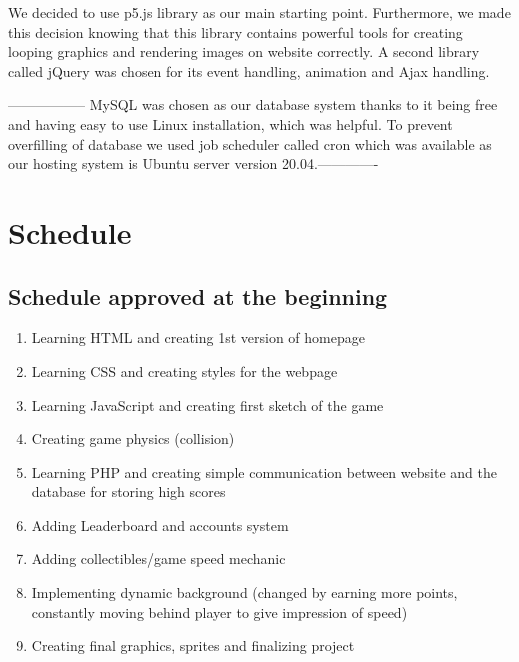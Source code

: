 \documentclass[oneside,a4paper,11pt]{report}
\begin{document}
\par
We decided to use p5.js library as our main starting point. Furthermore, we made this decision knowing that this library contains powerful tools for creating looping graphics and rendering images on website correctly. A second library called jQuery was chosen for its event handling, animation and Ajax handling.

\par
-----------------
MySQL was chosen as our database system thanks to it being free and having easy to use Linux installation, which was helpful. To prevent overfilling of database we used job scheduler called cron which was available as our hosting system is Ubuntu server version 20.04.-------------


\chapter{Schedule}
\section{Schedule approved at the beginning}
\begin{enumerate}
  \item Learning HTML and creating 1st version of homepage
  \item Learning CSS and creating styles for the webpage
  \item Learning JavaScript and creating first sketch of the game  \item Creating game physics (collision)
  \item Learning PHP and creating simple communication between website and the database for storing high scores
  \item Adding Leaderboard and accounts system
  \item Adding collectibles/game speed mechanic
  \item Implementing dynamic background (changed by earning more points, constantly moving behind player to give impression of speed)
  \item Creating final graphics, sprites and finalizing project
\end{enumerate}

\newpage
\end{document}
